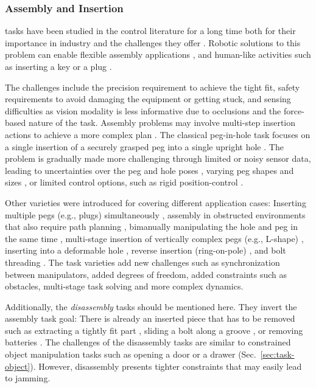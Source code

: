 \documentclass[Afour,sageh,times]{template/sagej}
\newcommand{\suggest}[1]{{\color{olive} (#1)}}
\begin{document}
\subsubsection{Assembly and Insertion}\label{sec:task-assembly}
tasks have been studied in the control literature for a long time both for their importance in industry and the challenges they offer \citep{jiang2020state}. 
Robotic solutions to this problem can enable flexible assembly applications \citep{67}, and human-like activities such as inserting a key or a plug \citep{179, 85}.

The challenges include the precision requirement to achieve the tight fit, safety requirements to avoid damaging the equipment or getting stuck, and sensing difficulties as vision modality is less informative due to occlusions and the force-based nature of the task. 
Assembly problems may involve multi-step insertion actions to achieve a more complex plan \citep{43, 10}. 
The classical peg-in-hole task focuses on a single insertion of a securely grasped peg into a single upright hole \citep{levine2014learning}. 
The problem is gradually made more challenging through limited or noisy sensor data, leading to uncertainties over the peg and hole poses \citep{104}, varying peg shapes and sizes \citep{87}, or limited control options, such as rigid position-control \citep{96}.

Other varieties were introduced for covering different application cases: 
Inserting multiple pegs (e.g., plugs) simultaneously \citep{30, 72}, 
assembly in obstructed environments that also require path planning \citep{99}, 
bimanually manipulating the hole and peg in the same time \citep{12, 31}, 
multi-stage insertion of vertically complex pegs (e.g., L-shape) \citep{27}, 
inserting into a deformable hole \citep{193}, 
reverse insertion (ring-on-pole) \citep{192}, 
and bolt threading \citep{10}.
The task varieties add new challenges such as synchronization between manipulators, added degrees of freedom, added constraints such as obstacles, multi-stage task solving and more complex dynamics.

Additionally, the \textit{disassembly} tasks should be mentioned here.
They invert the assembly task goal: There is already an inserted piece that has to be removed such as extracting a tightly fit part \citep{62}, sliding a bolt along a groove \citep{20}, or removing batteries \citep{113}.
The challenges of the disassembly tasks are similar to constrained object manipulation tasks such as opening a door or a drawer (Sec.~\ref{sec:task-object}). However, disassembly presents tighter constraints that may easily lead to jamming.
\end{document}
